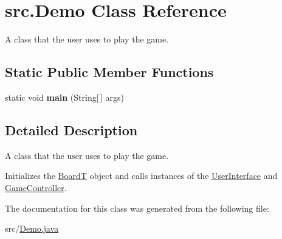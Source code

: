 \hypertarget{classsrc_1_1Demo}{}\section{src.\+Demo Class Reference}
\label{classsrc_1_1Demo}


A class that the user uses to play the game.  


\subsection*{Static Public Member Functions}
\begin{DoxyCompactItemize}
\item 
\mbox{\label{classsrc_1_1Demo_afd0a0e080c9bbf2c1b75476c7d54b7e8}} 
static void {\bfseries main} (String\mbox{[}$\,$\mbox{]} args)
\end{DoxyCompactItemize}


\subsection{Detailed Description}
A class that the user uses to play the game. 

Initializes the \hyperlink{classsrc_1_1BoardT}{BoardT} object and calls instances of the \hyperlink{classsrc_1_1UserInterface}{User\+Interface} and \hyperlink{classsrc_1_1GameController}{Game\+Controller}. 

The documentation for this class was generated from the following file\+:\begin{DoxyCompactItemize}
\item 
src/\hyperlink{Demo_8java}{Demo.\+java}\end{DoxyCompactItemize}
